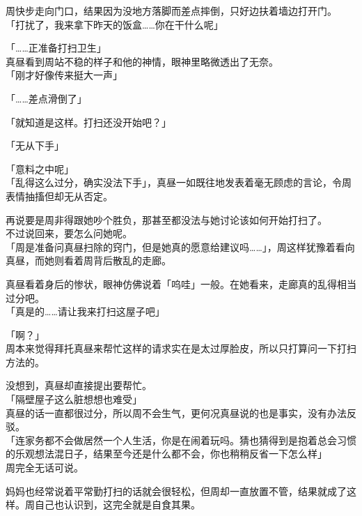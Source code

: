 周快步走向门口，结果因为没地方落脚而差点摔倒，只好边扶着墙边打开门。\\

「打扰了，我来拿下昨天的饭盒……你在干什么呢」

「……正准备打扫卫生」\\

真昼看到周站不稳的样子和他的神情，眼神里略微透出了无奈。\\

「刚才好像传来挺大一声」

「……差点滑倒了」

「就知道是这样。打扫还没开始吧？」

「无从下手」

「意料之中呢」\\

「乱得这么过分，确实没法下手」，真昼一如既往地发表着毫无顾虑的言论，令周表情抽搐但却无从否定。

再说要是周非得跟她吵个胜负，那甚至都没法与她讨论该如何开始打扫了。\\

不过说回来，要怎么问她呢。\\

「周是准备问真昼扫除的窍门，但是她真的愿意给建议吗……」，周这样犹豫着看向真昼，而她则看着周背后散乱的走廊。

真昼看着身后的惨状，眼神仿佛说着「呜哇」一般。在她看来，走廊真的乱得相当过分吧。\\

「真是的……请让我来打扫这屋子吧」

「啊？」\\

周本来觉得拜托真昼来帮忙这样的请求实在是太过厚脸皮，所以只打算问一下打扫方法的。

没想到，真昼却直接提出要帮忙。\\

「隔壁屋子这么脏想想也难受」\\

真昼的话一直都很过分，所以周不会生气，更何况真昼说的也是事实，没有办法反驳。\\

「连家务都不会做居然一个人生活，你是在闹着玩吗。猜也猜得到是抱着总会习惯的乐观想法混日子，结果至今还是什么都不会，你也稍稍反省一下怎么样」\\

周完全无话可说。

妈妈也经常说着平常勤打扫的话就会很轻松，但周却一直放置不管，结果就成了这样。周自己也认识到，这完全就是自食其果。\\

